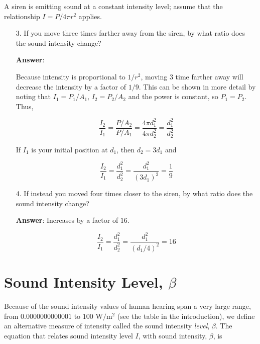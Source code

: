 \documentclass{article}
\begin{document}
\vskip 0.75pt

A siren is emitting sound at a constant intensity level; assume that the relationship $I = P/4\pi r^2$ applies.

\begin{enumerate}

  \item[3.] If you move three times farther away from the siren, by what ratio does the sound intensity change?

            \ifsolutions
            \textbf{Answer}:

            Because intensity is proportional to $1/r^2$, moving 3 time farther away will decrease the intensity by a factor of $1/9$. This can be shown in more detail by noting that $I_1 = P_1/A_1$, $I_2=P_2/A_2$ and the power is constant, so $P_1=P_2$. Thus,

            $$\frac{I_2}{I_1} = \frac{P/A_2}{P/A_1} = \frac{4\pi d_1^2}{4\pi d_2^2} =  \frac{d_1^2}{d_2^2}$$

            If $I_1$ is your initial position at $d_1$, then $d_2 = 3d_1$ and

            $$\frac{I_2}{I_1} =  \frac{d_1^2}{d_2^2} = \frac{d_1^2}{(3d_1)^2} = \frac{1}{9}$$
            \else
            \vskip 120pt
            \fi

  \item[4.] If instead you moved four times closer to the siren, by what ratio does the sound intensity change?

            \ifsolutions
            \textbf{Answer}: Increases by a factor of $16$.

            $$\frac{I_2}{I_1} = \frac{d_1^2}{d_2^2} =  \frac{d_1^2}{(d_1/4)^2} = 16$$
            \else
            \fi

\end{enumerate}

\newpage

\section{Sound Intensity Level, $\beta$}

Because of the sound intensity values of human hearing span a very large range, from $0.0000000000001$ to $100$ $\text{W}/\text{m}^2$ (see the table in the introduction), we define an alternative measure of intensity called the sound intensity \emph{level}, $\beta$. The equation that relates sound intensity level $I$, with sound intensity, $\beta$, is
\end{document}
